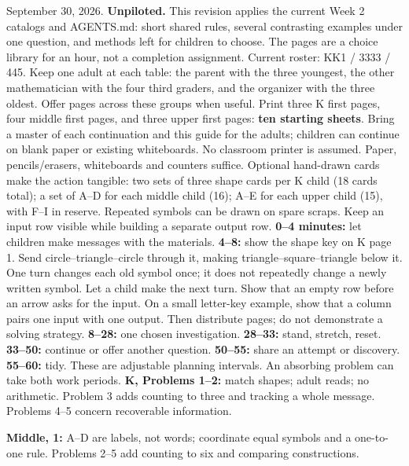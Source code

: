 \documentclass[11pt]{article}
\begin{document}
\fontsize{10.5}{12.7}\selectfont\setlength{\parskip}{6pt}
September 30, 2026. \textbf{Unpiloted.} This revision applies the current Week 2 catalogs and AGENTS.md: short shared rules, several contrasting examples under one question, and methods left for children to choose. The pages are a choice library for an hour, not a completion assignment.
Current roster: KK1 / 3333 / 445. Keep one adult at each table: the parent with the three youngest, the other mathematician with the four third graders, and the organizer with the three oldest. Offer pages across these groups when useful. Print three K first pages, four middle first pages, and three upper first pages: \textbf{ten starting sheets}. Bring a master of each continuation and this guide for the adults; children can continue on blank paper or existing whiteboards. No classroom printer is assumed.
Paper, pencils/erasers, whiteboards and counters suffice. Optional hand-drawn cards make the action tangible: two sets of three shape cards per K child (18 cards total); a set of A--D for each middle child (16); A--E for each upper child (15), with F--I in reserve. Repeated symbols can be drawn on spare scraps. Keep an input row visible while building a separate output row.
\textbf{0--4 minutes:} let children make messages with the materials. \textbf{4--8:} show the shape key on K page 1. Send circle--triangle--circle through it, making triangle--square--triangle below it. One turn changes each old symbol once; it does not repeatedly change a newly written symbol. Let a child make the next turn. Show that an empty row before an arrow asks for the input. On a small letter-key example, show that a column pairs one input with one output. Then distribute pages; do not demonstrate a solving strategy.
\textbf{8--28:} one chosen investigation. \textbf{28--33:} stand, stretch, reset. \textbf{33--50:} continue or offer another question. \textbf{50--55:} share an attempt or discovery. \textbf{55--60:} tidy. These are adjustable planning intervals. An absorbing problem can take both work periods.
\textbf{K, Problems 1--2:} match shapes; adult reads; no arithmetic. Problem 3 adds counting to three and tracking a whole message. Problems 4--5 concern recoverable information.\par
\textbf{Middle, 1:} A--D are labels, not words; coordinate equal symbols and a one-to-one rule. Problems 2--5 add counting to six and comparing constructions.\par
\end{document}
